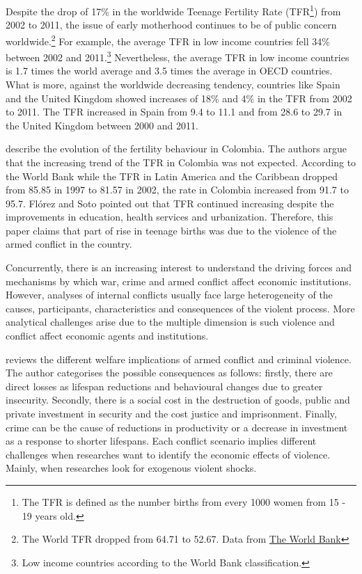 \documentclass[a4paper,10pt,twocolumn,preprint,3p,authoryear]{elsarticle}
\begin{document}
Despite the drop of 17\% in the worldwide Teenage Fertility Rate (TFR\footnote{The TFR is defined as the number births from every 1000 women from 15 - 19 years old.}) from 2002 to 2011, the issue of early motherhood continues to be of public concern worldwide.\footnote{The World TFR dropped from 64.71 to 52.67. Data from \href{http://data.worldbank.org}{The World Bank}} For example, the average TFR in low income countries fell 34\% between 2002 and 2011.\footnote{Low income countries according to the World Bank classification.} Nevertheless, the average TFR in low income countries is 1.7 times the world average and 3.5 times the average in OECD countries.  What is more, against the worldwide decreasing tendency, countries like Spain and the United Kingdom showed increases of 18\% and 4\% in the TFR from 2002 to 2011. The TFR increased in Spain from 9.4 to 11.1 and from 28.6 to 29.7 in the United Kingdom between 2000 and 2011.

\cite{FlorezSoto2007} describe the evolution of the fertility behaviour in Colombia. The authors argue that the increasing trend of the TFR in Colombia was not expected. According to the World Bank while the TFR in Latin America and the Caribbean dropped from 85.85 in 1997 to 81.57 in 2002, the rate in Colombia increased from 91.7 to 95.7. Fl\'orez and Soto pointed out that TFR continued increasing despite the improvements in education, health services and urbanization. Therefore, this paper claims that part of rise in teenage births was due to the violence of the armed conflict in the country.

Concurrently, there is an increasing interest to understand the driving forces and mechanisms by which war, crime and armed conflict affect economic institutions.  However, analyses of internal conflicts usually face large heterogeneity of the causes, participants, characteristics and consequences of the violent process. More analytical challenges arise due to the multiple dimension is such violence and conflict affect economic agents and institutions. 

\citet{Soares2013} reviews the different welfare implications of armed conflict and criminal violence. The author categorises the possible consequences as follows: firstly, there are direct losses as lifespan reductions and behavioural changes due to greater insecurity. Secondly, there is a social cost in the destruction of goods, public and private investment in security and the cost justice and imprisonment. Finally, crime can be the cause of reductions in productivity  or a decrease in investment as a response to shorter lifespans. Each conflict scenario implies different challenges when researches want to identify the economic effects of violence. Mainly, when researches look for exogenous violent shocks.
\end{document}
